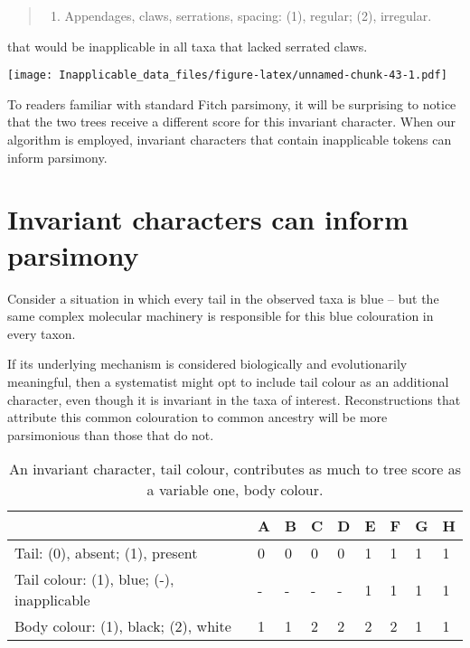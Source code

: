 \documentclass[]{book}
\providecommand{\tightlist}{%
  \setlength{\itemsep}{0pt}\setlength{\parskip}{0pt}}
\theoremstyle{definition}
\theoremstyle{definition}
\theoremstyle{definition}
\theoremstyle{remark}
\begin{document}
\begin{quote}
\begin{enumerate}
\def\labelenumi{\arabic{enumi}.}
\setcounter{enumi}{4}
\tightlist
\item
  Appendages, claws, serrations, spacing: (1), regular; (2), irregular.
\end{enumerate}
\end{quote}

that would be inapplicable in all taxa that lacked serrated claws.

\texttt{[image: Inapplicable\_data\_files/figure-latex/unnamed-chunk-43-1.pdf]}

To readers familiar with standard Fitch parsimony, it will be surprising
to notice that the two trees receive a different score for this
invariant character. When our algorithm is employed, invariant
characters that contain inapplicable tokens can inform parsimony.

\hypertarget{invariant-characters-can-inform-parsimony}{%
\section{Invariant characters can inform
parsimony}\label{invariant-characters-can-inform-parsimony}}

Consider a situation in which every tail in the observed taxa is blue --
but the same complex molecular machinery is responsible for this blue
colouration in every taxon.

If its underlying mechanism is considered biologically and
evolutionarily meaningful, then a systematist might opt to include tail
colour as an additional character, even though it is invariant in the
taxa of interest. Reconstructions that attribute this common colouration
to common ancestry will be more parsimonious than those that do not.

\begin{table}

\caption{\label{tab:unnamed-chunk-44}An invariant character, tail colour, contributes as much to tree score as a variable one, body colour.}
\centering
\begin{tabular}[t]{l|l|l|l|l|l|l|l|l}
\hline
  & A & B & C & D & E & F & G & H\\
\hline
Tail: (0), absent; (1), present & 0 & 0 & 0 & 0 & 1 & 1 & 1 & 1\\
\hline
Tail colour: (1), blue; (-), inapplicable & - & - & - & - & 1 & 1 & 1 & 1\\
\hline
Body colour: (1), black; (2), white & 1 & 1 & 2 & 2 & 2 & 2 & 1 & 1\\
\hline
\end{tabular}
\end{table}
\end{document}
